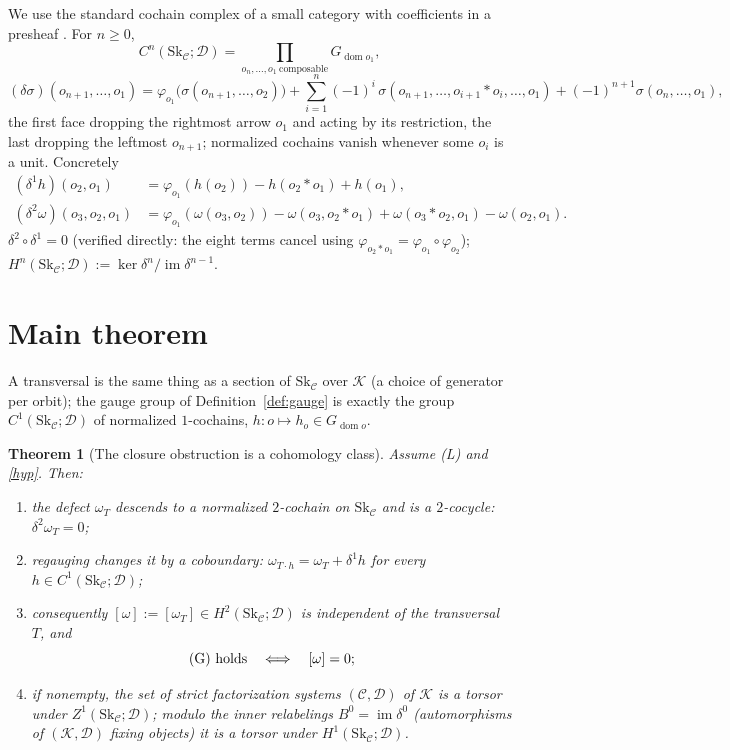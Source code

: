 \documentclass[11pt]{article}
\newtheorem{theorem}{Theorem}
\theoremstyle{definition}
\newcommand{\C}{\mathcal{C}}
\newcommand{\D}{\mathcal{D}}
\newcommand{\K}{\mathcal{K}}
\newcommand{\Sk}{\mathrm{Sk}}
\newcommand{\dom}{\operatorname{dom}}
\newcommand{\1}{\mathbf{1}}
\begin{document}
We use the standard cochain complex of a small category with coefficients in a
presheaf \cite{baueswirsching,roos}. For $n\ge 0$,
\[
   C^n(\Sk_\C;\D)=\!\!\prod_{o_n,\dots,o_1\ \text{composable}}\!\! G_{\dom o_1},
\]
\[
   (\delta\sigma)(o_{n+1},\dots,o_1)=
   \varphi_{o_1}\!\big(\sigma(o_{n+1},\dots,o_2)\big)
   +\sum_{i=1}^{n}(-1)^i\,\sigma(o_{n+1},\dots,o_{i+1}\ast o_i,\dots,o_1)
   +(-1)^{n+1}\sigma(o_{n},\dots,o_1),
\]
the first face dropping the rightmost arrow $o_1$ and acting by its restriction,
the last dropping the leftmost $o_{n+1}$; normalized cochains vanish whenever some
$o_i$ is a unit. Concretely
\begin{align}
(\delta^1 h)(o_2,o_1)&=\varphi_{o_1}(h(o_2))-h(o_2\ast o_1)+h(o_1),\label{eq:d1}\\
(\delta^2\omega)(o_3,o_2,o_1)&=\varphi_{o_1}(\omega(o_3,o_2))-\omega(o_3,o_2\ast o_1)
   +\omega(o_3\ast o_2,o_1)-\omega(o_2,o_1).\label{eq:d2}
\end{align}
$\delta^2\circ\delta^1=0$ (verified directly: the eight terms cancel using
$\varphi_{o_2\ast o_1}=\varphi_{o_1}\circ\varphi_{o_2}$);
$H^n(\Sk_\C;\D):=\ker\delta^{n}/\operatorname{im}\delta^{n-1}$.

\section{Main theorem}

A transversal is the same thing as a section of $\Sk_\C$ over $\K$ (a choice of
generator per orbit); the gauge group of Definition~\ref{def:gauge} is exactly the
group $C^1(\Sk_\C;\D)$ of normalized $1$-cochains, $h\colon o\mapsto h_o\in
G_{\dom o}$.

\begin{theorem}[The closure obstruction is a cohomology class]\label{thm:main}
Assume \textnormal{(L)} and \ref{hyp}. Then:
\begin{enumerate}
\item the defect $\omega_T$ descends to a normalized $2$-cochain on $\Sk_\C$ and is
a $2$-cocycle: $\delta^2\omega_T=0$;
\item regauging changes it by a coboundary: $\omega_{T\cdot h}=\omega_T+\delta^1 h$
for every $h\in C^1(\Sk_\C;\D)$;
\item consequently $[\omega]:=[\omega_T]\in H^2(\Sk_\C;\D)$ is independent of the
transversal $T$, and
\[
   \textnormal{(G) holds}\quad\Longleftrightarrow\quad [\omega]=0 ;
\]
\item if nonempty, the set of strict factorization systems $(\C,\D)$ of $\K$ is a
torsor under $Z^1(\Sk_\C;\D)$; modulo the inner relabelings
$B^0=\operatorname{im}\delta^0$ (automorphisms of $(\K,\D)$ fixing objects) it is a
torsor under $H^1(\Sk_\C;\D)$.
\end{enumerate}
\end{theorem}
\end{document}
